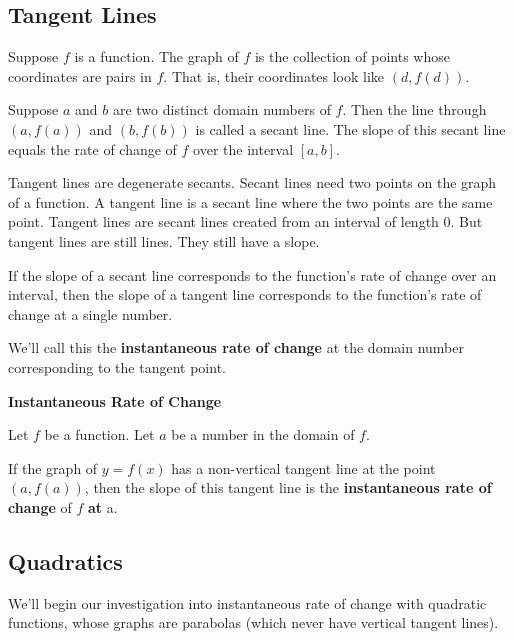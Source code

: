 \documentclass{ximera}
\begin{document}
\subsection*{Tangent Lines}

Suppose $f$ is a function.  The graph of $f$ is the collection of points whose coordinates are pairs in $f$.  That is, their coordinates look like $(d, f(d))$.

Suppose $a$ and $b$ are two distinct domain numbers of $f$.  Then the line through $(a, f(a))$ and $(b, f(b))$ is called a secant line.  The slope of this secant line equals the rate of change of $f$ over the interval $[a, b]$.

Tangent lines are degenerate secants. Secant lines need two points on the graph of a function.  A tangent line is a secant line where the two points are the same point. Tangent lines are secant lines created from an interval of length $0$.  But tangent lines are still lines.  They still have a slope.


If the slope of a secant line corresponds to the function's rate of change over an interval, then the slope of a tangent line corresponds to the function's rate of change at a single number.


We'll call this the \textbf{\textcolor{purple!85!blue}{instantaneous rate of change}} at the domain number corresponding to the tangent point.




\begin{definition} \textbf{\textcolor{green!50!black}{Instantaneous Rate of Change}}  


Let $f$ be a function. Let $a$ be a number in the domain of $f$.

If the graph of $y = f(x)$ has a non-vertical tangent line at the point $(a, f(a))$, then the slope of this tangent line is the \textbf{instantaneous rate of change} of $f$ \textbf{at} a.


\end{definition}














\subsection*{Quadratics}

We'll begin our investigation into instantaneous rate of change with quadratic functions, whose graphs are parabolas (which never have vertical tangent lines). \\
\end{document}

